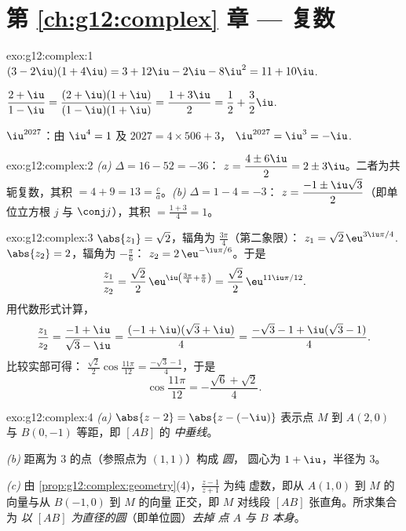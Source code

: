 \section*{第 \ref{ch:g12:complex} 章 --- 复数}

\begin{solution}{exo:g12:complex:1}
$(3-2\iu)(1+4\iu) = 3 + 12\iu - 2\iu - 8\iu^2 = 11 + 10\iu$.

$\dfrac{2+\iu}{1-\iu} = \dfrac{(2+\iu)(1+\iu)}{(1-\iu)(1+\iu)}
= \dfrac{1 + 3\iu}{2} = \dfrac12 + \dfrac32\iu$.

$\iu^{2027}$：由 $\iu^4 = 1$ 及 $2027 = 4 \times 506 + 3$，
$\iu^{2027} = \iu^3 = -\iu$.
\end{solution}

\begin{solution}{exo:g12:complex:2}
\emph{(a)} $\Delta = 16 - 52 = -36$：
$z = \dfrac{4 \pm 6\iu}{2} = 2 \pm 3\iu$。二者为共轭复数，其积
$= 4 + 9 = 13 = \frac ca$。\emph{(b)} $\Delta = 1 - 4 = -3$：
$z = \dfrac{-1 \pm \iu\sqrt3}{2}$（即单位立方根 $j$ 与
$\conj j$），其积 $= \frac{1 + 3}{4} = 1$。
\end{solution}

\begin{solution}{exo:g12:complex:3}
$\abs{z_1} = \sqrt2$，辐角为 $\frac{3\pi}{4}$（第二象限）：
$z_1 = \sqrt2\,\eu^{3\iu\pi/4}$.
$\abs{z_2} = 2$，辐角为 $-\frac\pi6$：
$z_2 = 2\,\eu^{-\iu\pi/6}$。于是
\[
\frac{z_1}{z_2} = \frac{\sqrt2}{2}\,\eu^{\iu\left(\frac{3\pi}{4} + \frac{\pi}{6}\right)}
= \frac{\sqrt2}{2}\,\eu^{11\iu\pi/12}.
\]
用代数形式计算，
\[
\frac{z_1}{z_2} = \frac{-1+\iu}{\sqrt3 - \iu}
= \frac{(-1+\iu)(\sqrt3+\iu)}{4}
= \frac{-\sqrt3 - 1 + \iu(\sqrt3 - 1)}{4}.
\]
比较实部可得：
$\frac{\sqrt2}{2}\cos\frac{11\pi}{12} = \frac{-\sqrt3-1}{4}$，于是
\[
\cos\frac{11\pi}{12} = -\frac{\sqrt6 + \sqrt2}{4}.
\]
\end{solution}

\begin{solution}{exo:g12:complex:4}
\emph{(a)} $\abs{z - 2} = \abs{z - (-\iu)}$ 表示点 $M$ 到
$A(2, 0)$ 与 $B(0, -1)$ 等距，即 $[AB]$ 的 \emph{中垂线}。

\emph{(b)} 距离为 $3$ 的点（参照点为 $(1,1)$）构成 \emph{圆}，
圆心为 $1 + \iu$，半径为 $3$。

\emph{(c)} 由 \cref{prop:g12:complex:geometry}(4)，$\frac{z-1}{z+1}$ 为纯
虚数，即从 $A(1,0)$ 到 $M$ 的向量与从 $B(-1,0)$ 到 $M$ 的向量
正交，即 $M$ 对线段 $[AB]$ 张直角。所求集合为
\emph{以 $[AB]$ 为直径的圆}（即单位圆）\emph{去掉
点 $A$ 与 $B$ 本身}。
\end{solution}

